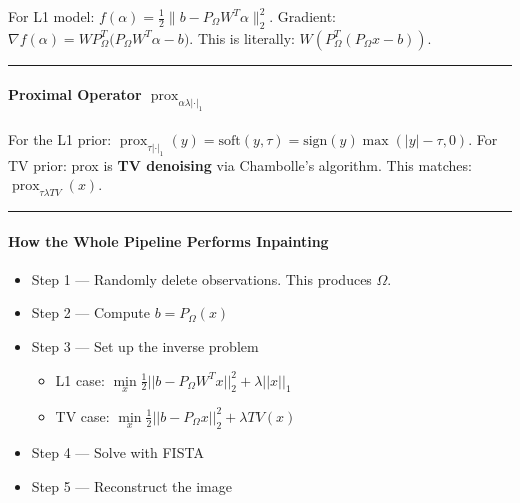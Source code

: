 \documentclass[11pt]{article}
\providecommand{\tightlist}{%
      \setlength{\itemsep}{0pt}\setlength{\parskip}{0pt}}
\begin{document}
For L1 model:
\(f(\alpha) = \frac{1}{2}\|b - P_\Omega W^T \alpha\|_2^2\). Gradient:
\(\nabla f(\alpha)= W P_\Omega^T \big(P_\Omega W^{T}\alpha - b\big)\).
This is literally: \(W( P_{\Omega}^{T}(P_{\Omega}x - b ) )\).

\begin{center}\rule{0.5\linewidth}{0.5pt}\end{center}

\hypertarget{proximal-operator-operatornameprox_alpha-lambda-cdot_1}{%
\paragraph{\texorpdfstring{\textbf{Proximal Operator
\(\operatorname{prox}_{\alpha \lambda | \cdot|_1}\)}}{Proximal Operator \textbackslash operatorname\{prox\}\_\{\textbackslash alpha \textbackslash lambda \textbar{} \textbackslash cdot\textbar\_1\}}}\label{proximal-operator-operatornameprox_alpha-lambda-cdot_1}}

For the L1 prior:
\(\operatorname{prox}_{\tau |\cdot|_1}(y) = \text{soft}(y,\tau) = \text{sign}(y)\max(|y|-\tau, 0)\).
For TV prior: prox is \textbf{TV denoising} via Chambolle's algorithm.
This matches: \(\operatorname{prox}_{\tau \lambda TV}(x)\).

\begin{center}\rule{0.5\linewidth}{0.5pt}\end{center}

\hypertarget{how-the-whole-pipeline-performs-inpainting}{%
\paragraph{\texorpdfstring{\textbf{How the Whole Pipeline Performs
Inpainting}}{How the Whole Pipeline Performs Inpainting}}\label{how-the-whole-pipeline-performs-inpainting}}

\begin{itemize}
\tightlist
\item
  Step 1 --- Randomly delete observations. This produces \(\Omega\).
\item
  Step 2 --- Compute \(b = P_\Omega(x)\)
\item
  Step 3 --- Set up the inverse problem

  \begin{itemize}
  \tightlist
  \item
    L1 case:
    \(\underset{x}{\min} \frac{1}{2}||b - P_\Omega W^T x||_2^2 + \lambda ||x||_1\)
  \item
    TV case:
    \(\underset{x}{\min} \frac{1}{2}||b - P_\Omega x||_2^2 + \lambda TV(x)\)
  \end{itemize}
\item
  Step 4 --- Solve with FISTA
\item
  Step 5 --- Reconstruct the image
\end{itemize}
\end{document}
